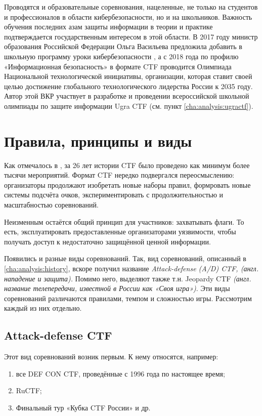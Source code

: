 Проводятся и образовательные соревнования, нацеленные, не только на студентов и профессионалов в области кибербезопасности, но и на школьников. Важность обучения последних азам защиты информации в теории и практике подтверждается государственным интересом в этой области. В 2017 году министр образования Российской Федерации Ольга Васильева предложила добавить в школьную программу уроки кибербезопасности \cite{RG17}, а с 2018 года по профилю «Информационная безопасность» в формате CTF проводится Олимпиада Национальной технологической инициативы, организации, которая ставит своей целью достижение глобального технологического лидерства России к 2035 году. Автор этой ВКР участвует в разработке и проведении всероссийской школьной олимпиады по защите информации Ugra CTF (см. пункт \ref{cha:analysis:ugractf}).



\section{Правила, принципы и виды}
\label{cha:analysis:rules}

Как отмечалось в \cite{CTFTimeTotal}, за 26 лет истории CTF было проведено как минимум более тысячи мероприятий. Формат CTF нередко подвергался переосмыслению: организаторы продолжают изобретать новые наборы правил, формровать новые системы подсчёта очков, экспериментировать с продолжительностью и масштабностью соревнований.

Неизменным остаётся общий принцип для участников: захватывать флаги. То есть, эксплуатировать предоставленные организаторами уязвимости, чтобы получать доступ к недостаточно защищённой ценной информации.

Появились и разные виды соревнований. Так, вид соревнований, описанный в \ref{cha:analysis:history}, вскоре получил название \textit{Attack-defense (A/D) CTF, (англ. нападение и защита).} Помимо него, выделяют также т.н. Jeopardy CTF \textit{(англ. название телепередачи, известной в России как «Своя игра»)}. Эти виды соревнований различаются правилами, темпом и сложностью игры. Рассмотрим каждый из них отдельно.


\subsection{Attack-defense CTF}

Этот вид соревнований возник первым. К нему относятся, например:
\begin{enumerate}
\item все DEF CON CTF, проведённые с 1996 года по настоящее время;
\item RuCTF;
\item Финальный тур «Кубка CTF России» и др.
\end{enumerate}

